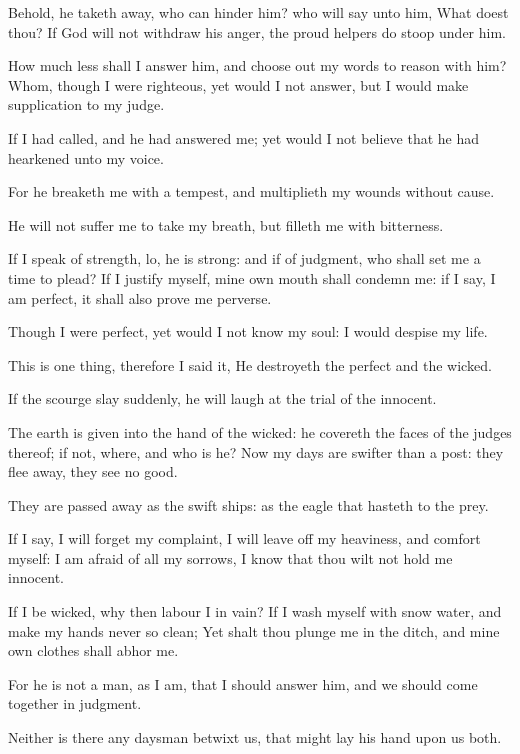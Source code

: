 \verse Behold, he taketh away, who can hinder him? who will say unto him, What doest thou?  \verse If God will not withdraw his anger, the proud helpers do stoop under him.

\verse How much less shall I answer him, and choose out my words to reason with him?  \verse Whom, though I were righteous, yet would I not answer, but I would make supplication to my judge.

\verse If I had called, and he had answered me; yet would I not believe that he had hearkened unto my voice.

\verse For he breaketh me with a tempest, and multiplieth my wounds without cause.

\verse He will not suffer me to take my breath, but filleth me with bitterness.

\verse If I speak of strength, lo, he is strong: and if of judgment, who shall set me a time to plead?  \verse If I justify myself, mine own mouth shall condemn me: if I say, I am perfect, it shall also prove me perverse.

\verse Though I were perfect, yet would I not know my soul: I would despise my life.

\verse This is one thing, therefore I said it, He destroyeth the perfect and the wicked.

\verse If the scourge slay suddenly, he will laugh at the trial of the innocent.

\verse The earth is given into the hand of the wicked: he covereth the faces of the judges thereof; if not, where, and who is he?  \verse Now my days are swifter than a post: they flee away, they see no good.

\verse They are passed away as the swift ships: as the eagle that hasteth to the prey.

\verse If I say, I will forget my complaint, I will leave off my heaviness, and comfort myself: \verse I am afraid of all my sorrows, I know that thou wilt not hold me innocent.

\verse If I be wicked, why then labour I in vain?  \verse If I wash myself with snow water, and make my hands never so clean; \verse Yet shalt thou plunge me in the ditch, and mine own clothes shall abhor me.

\verse For he is not a man, as I am, that I should answer him, and we should come together in judgment.

\verse Neither is there any daysman betwixt us, that might lay his hand upon us both.

